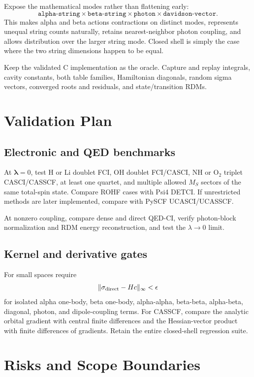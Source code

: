 \documentclass[11pt]{article}
\begin{document}
Expose the mathematical modes rather than flattening early:
\[
\texttt{alpha-string}\times\texttt{beta-string}\times
\texttt{photon}\times\texttt{davidson-vector}.
\]
This makes alpha and beta actions contractions on distinct modes, represents
unequal string counts naturally, retains nearest-neighbor photon coupling, and
allows distribution over the larger string mode. Closed shell is simply the
case where the two string dimensions happen to be equal.

Keep the validated C implementation as the oracle. Capture and replay
integrals, cavity constants, both table families, Hamiltonian diagonals, random
sigma vectors, converged roots and residuals, and state/transition RDMs.

\section{Validation Plan}

\subsection{Electronic and QED benchmarks}

At \(\boldsymbol\lambda=0\), test H or Li doublet FCI, OH doublet FCI/CASCI,
NH or O$_2$ triplet CASCI/CASSCF, at least one quartet, and multiple allowed
\(M_S\) sectors of the same total-spin state. Compare ROHF cases with Psi4
DETCI. If unrestricted methods are later implemented, compare with PySCF
UCASCI/UCASSCF.

At nonzero coupling, compare dense and direct QED-CI, verify photon-block
normalization and RDM energy reconstruction, and test the \(\lambda\to0\)
limit.

\subsection{Kernel and derivative gates}

For small spaces require
\[
\|\sigma_{\rm direct}-Hc\|_\infty<\epsilon
\]
for isolated alpha one-body, beta one-body, alpha-alpha, beta-beta,
alpha-beta, diagonal, photon, and dipole-coupling terms. For CASSCF, compare
the analytic orbital gradient with central finite differences and the
Hessian-vector product with finite differences of gradients. Retain the entire
closed-shell regression suite.

\section{Risks and Scope Boundaries}
\end{document}
